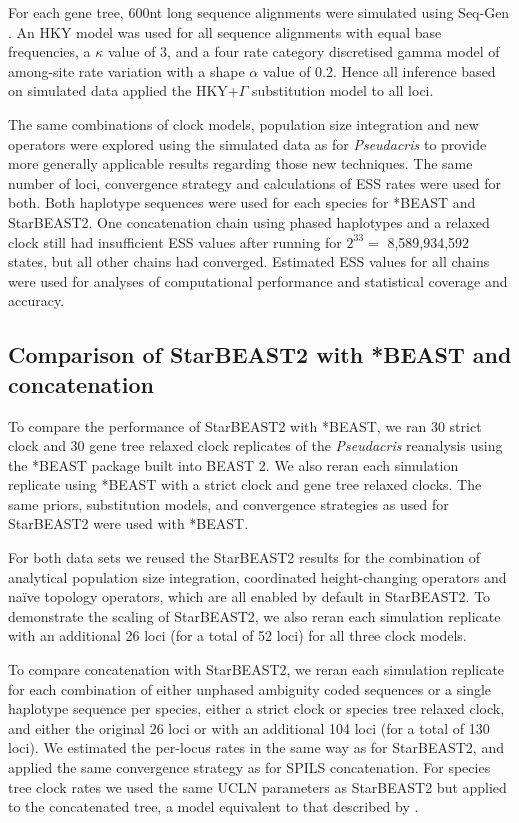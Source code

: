 \documentclass[nogrid]{MBE}%
\begin{document}
For each gene tree, 600nt long sequence alignments were simulated using Seq-Gen \citep{Rambaut01061997}. An HKY model was used for all sequence alignments
with equal base frequencies, a $\kappa$ value of 3, and a four rate category
discretised gamma model of among-site rate variation with a shape $\alpha$
value of 0.2. Hence all inference based on simulated data applied the HKY+$\Gamma$
substitution model to all loci.

The same combinations of clock models, population size integration and new
operators were explored using the simulated data as for \textit{Pseudacris} to
provide more generally applicable results regarding those new techniques. The
same number of loci, convergence strategy and calculations of ESS rates were
used for both. Both haplotype sequences were used for each species for *BEAST
and StarBEAST2. One concatenation chain using phased haplotypes and a relaxed
clock still had insufficient ESS values after running for $2^{33} =$
8,589,934,592 states, but all other chains had converged. Estimated ESS
values for all chains were used for analyses of computational performance and
statistical coverage and accuracy.

\subsection{Comparison of StarBEAST2 with *BEAST and concatenation}

To compare the performance of StarBEAST2 with *BEAST, we ran 30 strict clock
and 30 gene tree relaxed clock replicates of the \textit{Pseudacris}
reanalysis using the *BEAST package built into BEAST 2. We also reran each
simulation replicate using *BEAST with a strict clock and gene tree relaxed
clocks. The same priors, substitution models, and convergence strategies as
used for StarBEAST2 were used with *BEAST.

For both data sets we reused the StarBEAST2 results for the combination of
analytical population size integration, coordinated height-changing operators
and na\"ive topology operators, which are all enabled by default in
StarBEAST2. To demonstrate the scaling of StarBEAST2, we also reran each
simulation replicate with an additional 26 loci (for a total of 52 loci) for
all three clock models.

To compare concatenation with StarBEAST2, we reran each simulation replicate
for each combination of either unphased ambiguity coded sequences or a single
haplotype sequence per species, either a strict clock or species tree relaxed
clock, and either the original 26 loci or with an additional 104 loci (for a
total of 130 loci). We estimated the per-locus rates in the same way as for
StarBEAST2, and applied the same convergence strategy as for SPILS
concatenation. For species tree clock rates we used the same UCLN parameters
as StarBEAST2 but applied to the concatenated tree, a model equivalent to that
described by \cite{Rasmussen01122007}.
\end{document}
